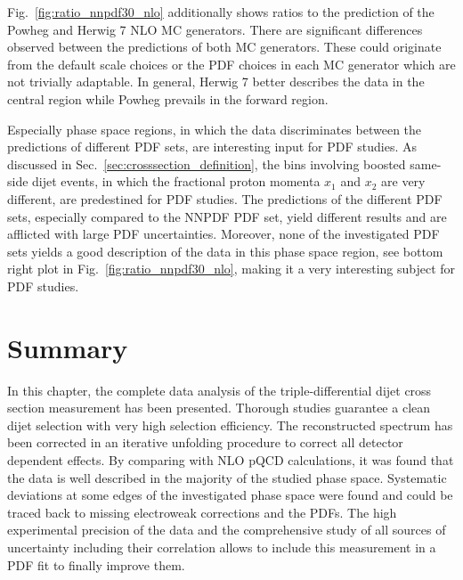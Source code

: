 Fig.~\ref{fig:ratio_nnpdf30_nlo} additionally shows ratios to the prediction of
the Powheg and Herwig 7 NLO MC generators. There are significant differences
observed between the predictions of both MC generators. These could originate
from the default scale choices or the PDF choices in each MC generator which are
not trivially adaptable. In general, Herwig 7 better describes the data in the
central region while Powheg prevails in the forward region.

Especially phase space regions, in which the data discriminates between the
predictions of different PDF sets, are interesting input for PDF studies. As
discussed in Sec.~\ref{sec:crosssection_definition}, the bins involving boosted
same-side dijet events, in which the fractional proton momenta $x_1$ and $x_2$
are very different, are predestined for PDF studies. The predictions of the
different PDF sets, especially compared to the NNPDF PDF set, yield different
results and are afflicted with large PDF uncertainties. Moreover, none of the
investigated PDF sets yields a good description of the data in this phase space
region, see bottom right plot in Fig.~\ref{fig:ratio_nnpdf30_nlo}, making it a very
interesting subject for PDF studies.

\section{Summary}

In this chapter, the complete data analysis of the triple-differential dijet
cross section measurement has been presented. Thorough studies guarantee a clean
dijet selection with very high selection efficiency. The reconstructed spectrum
has been corrected in an iterative unfolding procedure to correct all detector
dependent effects. By comparing with NLO pQCD calculations, it was found that
the data is well described in the majority of the studied phase space.
Systematic deviations at some edges of the investigated phase space were found
and could be traced back to missing electroweak corrections and the PDFs. The
high experimental precision of the data and the comprehensive study of all sources of
uncertainty including their correlation allows to include this measurement in a
PDF fit to finally improve them.


